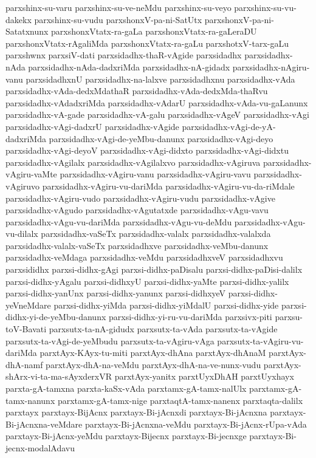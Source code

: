 {parxshinx-su-varu
parxshinx-su-ve-neMdu
parxshinx-su-veyo
parxshinx-su-vu-dakekx
parxshinx-su-vudu
parxshonxV-pa-ni-SatUtx
parxshonxV-pa-ni-Satatxnunx
parxshonxVtatx-ra-gaLa
parxshonxVtatx-ra-gaLeraDU
parxshonxVtatx-rAgaliMda
parxshonxVtatx-ra-gaLu
parxshotxV-tarx-gaLu
parxshwnx
parxsiV-dati
parxsidadhx-thaR-vAgide
parxsidadhx
parxsidadhx-nAda
parxsidadhx-nAda-dadxriMda
parxsidadhx-nA-gidadx
parxsidadhx-nAgiru-vanu
parxsidadhxnU
parxsidadhx-na-lalxve
parxsidadhxnu
parxsidadhx-vAda
parxsidadhx-vAda-dedxMdathaR
parxsidadhx-vAda-dedxMda-thaRvu
parxsidadhx-vAdadxriMda
parxsidadhx-vAdarU
parxsidadhx-vAda-vu-gaLanunx
parxsidadhx-vA-gade
parxsidadhx-vA-galu
parxsidadhx-vAgeV
parxsidadhx-vAgi
parxsidadhx-vAgi-dadxrU
parxsidadhx-vAgide
parxsidadhx-vAgi-de-yA-dadxriMda
parxsidadhx-vAgi-de-yeMbu-danunx
parxsidadhx-vAgi-deyo
parxsidadhx-vAgi-deyoV
parxsidadhx-vAgi-didxto
parxsidadhx-vAgi-didxtu
parxsidadhx-vAgilalx
parxsidadhx-vAgilalxvo
parxsidadhx-vAgiruva
parxsidadhx-vAgiru-vaMte
parxsidadhx-vAgiru-vanu
parxsidadhx-vAgiru-vavu
parxsidadhx-vAgiruvo
parxsidadhx-vAgiru-vu-dariMda
parxsidadhx-vAgiru-vu-da-riMdale
parxsidadhx-vAgiru-vudo
parxsidadhx-vAgiru-vudu
parxsidadhx-vAgive
parxsidadhx-vAgudo
parxsidadhx-vAgutatxde
parxsidadhx-vAgu-vavu
parxsidadhx-vAgu-vu-dariMda
parxsidadhx-vAgu-vu-deMdu
parxsidadhx-vAgu-vu-dilalx
parxsidadhx-vaSeTx
parxsidadhx-valalx
parxsidadhx-valalxda
parxsidadhx-valalx-vaSeTx
parxsidadhxve
parxsidadhx-veMbu-danunx
parxsidadhx-veMdaga
parxsidadhx-veMdu
parxsidadhxveV
parxsidadhxvu
parxsididhx
parxsi-didhx-gAgi
parxsi-didhx-paDisalu
parxsi-didhx-paDisi-dalilx
parxsi-didhx-yAgalu
parxsi-didhxyU
parxsi-didhx-yaMte
parxsi-didhx-yalilx
parxsi-didhx-yanUnx
parxsi-didhx-yanunx
parxsi-didhxyeV
parxsi-didhx-yeVneMdare
parxsi-didhx-yiMda
parxsi-didhx-yiMdalU
parxsi-didhx-yide
parxsi-didhx-yi-de-yeMbu-danunx
parxsi-didhx-yi-ru-vu-dariMda
parxsivx-piti
parxsu-toV-Bavati
parxsutx-ta-nA-gidudx
parxsutx-ta-vAda
parxsutx-ta-vAgide
parxsutx-ta-vAgi-de-yeMbudu
parxsutx-ta-vAgiru-vAga
parxsutx-ta-vAgiru-vu-dariMda
parxtAyx-KAyx-tu-miti
parxtAyx-dhAna
parxtAyx-dhAnaM
parxtAyx-dhA-namf
parxtAyx-dhA-na-veMdu
parxtAyx-dhA-na-ve-nunx-vudu
parxtAyx-shArx-vi-ta-ma-sAyxderxVR
parxtAyx-yanitx
parxtUyxDhAH
parxtUyxhayx
parxta-gA-tamxna
parxta-kaSx-vAda
parxtamx-gA-tamx-nalUlx
parxtamx-gA-tamx-nanunx
parxtamx-gA-tamx-nige
parxtaqtA-tamx-nanenx
parxtaqta-dalilx
parxtayx
parxtayx-BijAcnx
parxtayx-Bi-jAcnxdi
parxtayx-Bi-jAcnxna
parxtayx-Bi-jAcnxna-veMdare
parxtayx-Bi-jAcnxna-veMdu
parxtayx-Bi-jAcnx-rUpa-vAda
parxtayx-Bi-jAcnx-yeMdu
parxtayx-Bijecnx
parxtayx-Bi-jecnxge
parxtayx-Bi-jecnx-modalAdavu
}
